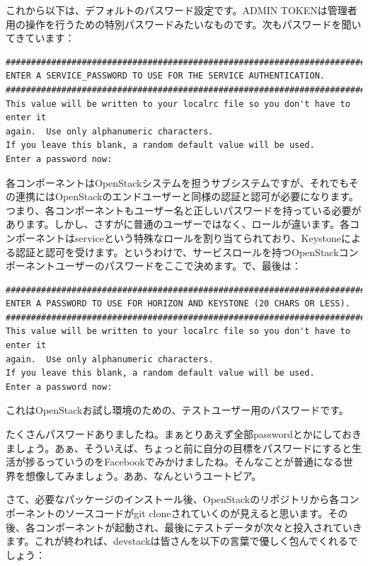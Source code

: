 \documentclass[9pt,b5paper,tombo,openany]{jsbook}
\begin{document}
これから以下は、デフォルトのパスワード設定です。ADMIN TOKENは管理者用の操作を行うための特別パスワードみたいなものです。次もパスワードを聞いてきています：

\begin{lstlisting}
################################################################################
ENTER A SERVICE_PASSWORD TO USE FOR THE SERVICE AUTHENTICATION.
################################################################################
This value will be written to your localrc file so you don't have to enter it
again.  Use only alphanumeric characters.
If you leave this blank, a random default value will be used.
Enter a password now:
\end{lstlisting}

各コンポーネントはOpenStackシステムを担うサブシステムですが、それでもその連携にはOpenStackのエンドユーザーと同様の認証と認可が必要になります。つまり、各コンポーネントもユーザー名と正しいパスワードを持っている必要があります。しかし、さすがに普通のユーザーではなく、ロールが違います。各コンポーネントはserviceという特殊なロールを割り当てられており、Keystoneによる認証と認可を受けます。というわけで、サービスロールを持つOpenStackコンポーネントユーザーのパスワードをここで決めます。で、最後は：

\begin{lstlisting}
################################################################################
ENTER A PASSWORD TO USE FOR HORIZON AND KEYSTONE (20 CHARS OR LESS).
################################################################################
This value will be written to your localrc file so you don't have to enter it
again.  Use only alphanumeric characters.
If you leave this blank, a random default value will be used.
Enter a password now:
\end{lstlisting}

これはOpenStackお試し環境のための、テストユーザー用のパスワードです。

たくさんパスワードありましたね。まぁとりあえず全部passwordとかにしておきましょう。あぁ、そういえば、ちょっと前に自分の目標をパスワードにすると生活が捗るっていうのをFacebookでみかけましたね。そんなことが普通になる世界を想像してみましょう。ああ、なんというユートピア。

さて、必要なパッケージのインストール後、OpenStackのリポジトリから各コンポーネントのソースコードがgit cloneされていくのが見えると思います。その後、各コンポーネントが起動され、最後にテストデータが次々と投入されていきます。これが終われば、devstackは皆さんを以下の言葉で優しく包んでくれるでしょう：
\end{document}
